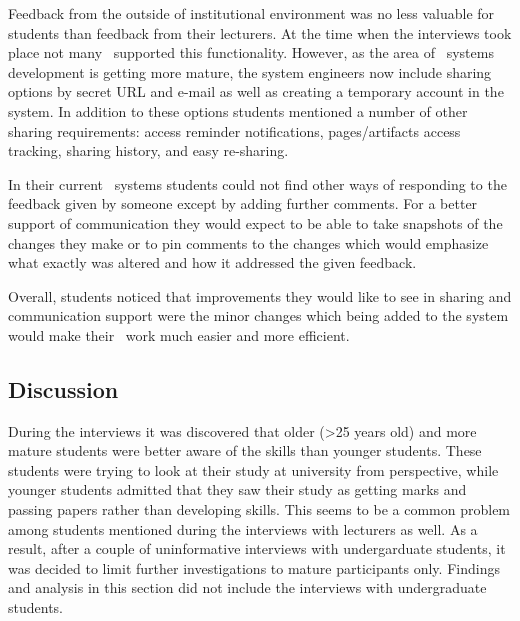 Feedback from the outside of institutional environment was no less valuable for
students than feedback from their lecturers. At the time when the interviews
took place not many \ep~supported this functionality. However, as the area of
\ep~systems development is getting more mature, the system engineers now include
sharing options by secret URL and e-mail as well as creating a temporary account
in the system. In addition to these options students mentioned a number of other
sharing requirements: access reminder notifications, pages/artifacts access
tracking, sharing history, and easy re-sharing.

In their current \ep~systems students could not find other ways of responding to
the feedback given by someone except by adding further comments. For a better
support of communication they would expect to be able to take snapshots of the
changes they make or to pin comments to the changes which would emphasize what
exactly was altered and how it addressed the given feedback.


Overall, students noticed that improvements they would like to see in sharing
and communication support were the minor changes which being added to the system
would make their \ep~work much easier and more efficient.

\subsection{Discussion}

During the interviews it was discovered that older (\textgreater 25 years old)
and more mature students were better aware of the \LLLs skills than younger
students. These students were trying to look at their study at university from
\LLLs perspective, while younger students admitted that they saw their study as
getting marks and passing papers rather than developing skills. This seems to
be a common problem among students mentioned during the interviews with
lecturers as well. As a result, after a couple of uninformative interviews with
undergarduate students, it was decided to limit further investigations to mature
participants only. Findings and analysis in this section did not include the
interviews with undergraduate students.

